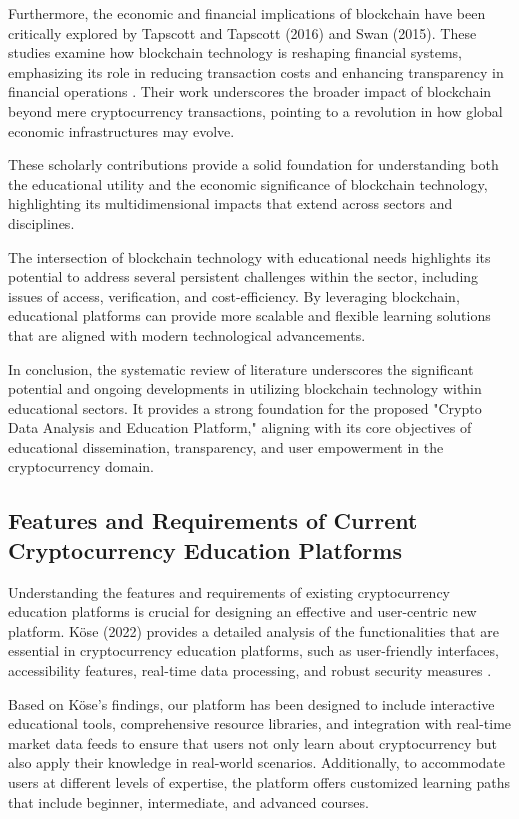 \documentclass[12pt]{report}
\begin{document}
Furthermore, the economic and financial implications of blockchain have been critically explored by Tapscott and Tapscott (2016) and Swan (2015). These studies examine how blockchain technology is reshaping financial systems, emphasizing its role in reducing transaction costs and enhancing transparency in financial operations \cite{tapscott2016, swan2015}. Their work underscores the broader impact of blockchain beyond mere cryptocurrency transactions, pointing to a revolution in how global economic infrastructures may evolve.

These scholarly contributions provide a solid foundation for understanding both the educational utility and the economic significance of blockchain technology, highlighting its multidimensional impacts that extend across sectors and disciplines.


The intersection of blockchain technology with educational needs highlights its potential to address several persistent challenges within the sector, including issues of access, verification, and cost-efficiency. By leveraging blockchain, educational platforms can provide more scalable and flexible learning solutions that are aligned with modern technological advancements.

In conclusion, the systematic review of literature underscores the significant potential and ongoing developments in utilizing blockchain technology within educational sectors. It provides a strong foundation for the proposed "Crypto Data Analysis and Education Platform," aligning with its core objectives of educational dissemination, transparency, and user empowerment in the cryptocurrency domain.

\subsection{Features and Requirements of Current Cryptocurrency Education Platforms}
Understanding the features and requirements of existing cryptocurrency education platforms is crucial for designing an effective and user-centric new platform. Köse (2022) provides a detailed analysis of the functionalities that are essential in cryptocurrency education platforms, such as user-friendly interfaces, accessibility features, real-time data processing, and robust security measures \cite{kose2022}. 

Based on Köse's findings, our platform has been designed to include interactive educational tools, comprehensive resource libraries, and integration with real-time market data feeds to ensure that users not only learn about cryptocurrency but also apply their knowledge in real-world scenarios. Additionally, to accommodate users at different levels of expertise, the platform offers customized learning paths that include beginner, intermediate, and advanced courses.
\end{document}
